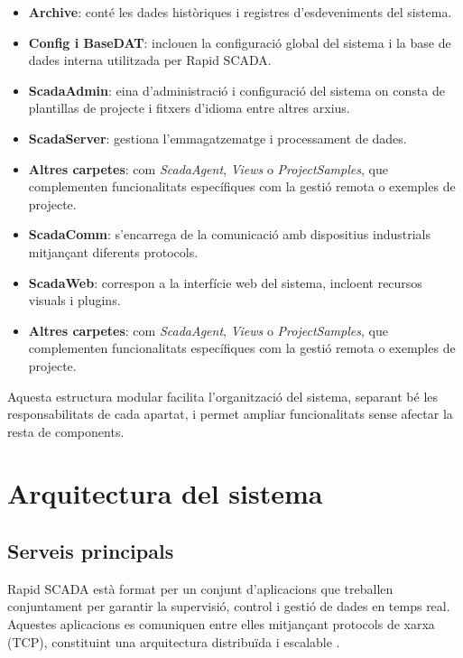 \documentclass[12pt,a4paper]{report}
\begin{document}
\begin{itemize}
    \item \textbf{Archive}: conté les dades històriques i registres d'esdeveniments del sistema.     
    \item \textbf{Config i BaseDAT}: inclouen la configuració global del sistema i la base de dades interna utilitzada per Rapid SCADA.

    \item \textbf{ScadaAdmin}: eina d'administració i configuració del sistema on consta de plantillas de projecte i fitxers d'idioma entre altres arxius.

    \item \textbf{ScadaServer}: gestiona l'emmagatzematge i processament de dades.

        \item \textbf{Altres carpetes}: com \textit{ScadaAgent}, \textit{Views} o \textit{ProjectSamples}, que complementen funcionalitats específiques com la gestió remota o exemples de projecte.


    \item \textbf{ScadaComm}: s'encarrega de la comunicació amb dispositius industrials mitjançant diferents protocols.


    \item \textbf{ScadaWeb}: correspon a la interfície web del sistema, incloent recursos visuals i plugins.

    \item \textbf{Altres carpetes}: com \textit{ScadaAgent}, \textit{Views} o \textit{ProjectSamples}, que complementen funcionalitats específiques com la gestió remota o exemples de projecte.

\end{itemize}

Aquesta estructura modular facilita l'organització del sistema, separant bé les responsabilitats de cada apartat, i permet ampliar funcionalitats sense afectar la resta de components.


\section{Arquitectura del sistema}


\subsection{Serveis principals}

Rapid SCADA està format per un conjunt d'aplicacions que treballen conjuntament per garantir la supervisió, control i gestió de dades en temps real. Aquestes aplicacions es comuniquen entre elles mitjançant protocols de xarxa (TCP), constituint una arquitectura distribuïda i escalable \cite{rapidscada_architecture}.
\end{document}
